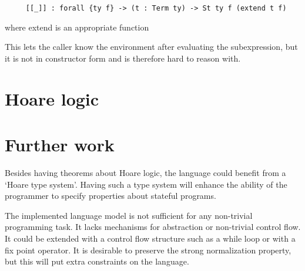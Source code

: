 \documentclass{article}
\begin{document}

\begin{lstlisting}
     [[_]] : forall {ty f} -> (t : Term ty) -> St ty f (extend t f)
\end{lstlisting}
where extend is an appropriate function

This lets the caller know the environment after evaluating the
subexpression, but it is not in constructor form and is therefore
hard to reason with.

\section{Hoare logic}


\section{Further work}\label{sec:further}

Besides having theorems about Hoare logic, the language could benefit from a `Hoare type system'. Having such a type system will enhance the ability of the programmer to specify properties about stateful programs.

The implemented language model is not sufficient for any non-trivial programming task. It lacks mechanisms for abstraction or non-trivial control flow. It could be extended with a control flow structure such as a while loop or with a fix point operator. It is desirable to preserve the strong normalization property, but this will put extra constraints on the language.
\end{document}
